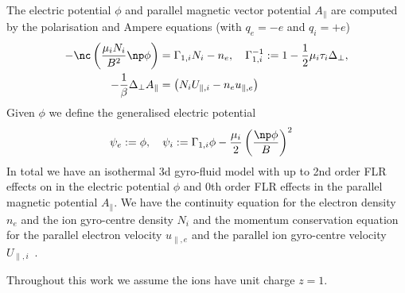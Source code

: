 The electric potential \(\phi\) and parallel magnetic vector potential \(A_\parallel\) are
computed by the polarisation and Ampere equations (with $q_e=-e$ and $q_i=+e$)
\begin{align}
 -\nc\left(\frac{\mu_iN_i}{B^2} \np \phi\right) &=  \Gamma_{1,i} N_i -n_e, \quad \Gamma_{1,i}^{-1} := 1-\frac{1}{2}\mu_i\tau_i\Delta_\perp , \\
  -\frac{1}{\beta} \Delta_\perp A_\parallel &= \left(N_i U_{\parallel,i}-n_e u_{\parallel,e} \right)
  \label{eq:polarisation_dimensional}
\end{align}
Given $\phi$ we define the generalised electric potential
\begin{align}
    \psi_e := \phi,\quad \psi_i&:= \Gamma_{1,i} \phi - \frac{\mu_i }{2}\left(\frac{\np\phi}{B}\right)^2
\end{align}
In total
we have an isothermal 3d gyro-fluid model with up to 2nd order FLR effects
on in the electric potential $\phi$ and 0th order FLR effects in the parallel magnetic
potential $A_\parallel$.
We have the continuity equation for the electron density \(n_e\) and the ion gyro-centre
density \(N_i\) and the momentum conservation equation for
the parallel electron velocity \(u_{\parallel,e}\) and the parallel ion gyro-centre velocity \(U_{\parallel,i}\)~\cite{WiesenbergerPhD, HeldPhD}.
\begin{tcolorbox}[title=Note]
    Throughout this work we assume the ions have unit charge $z=1$.
\end{tcolorbox}
